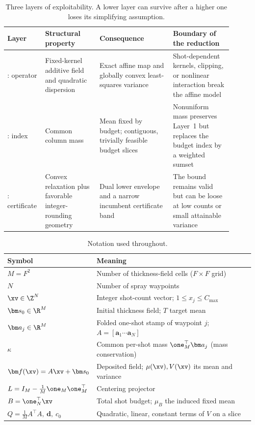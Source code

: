 \begin{table}[t]\centering\small\setlength{\tabcolsep}{4pt}
\caption{Three layers of exploitability.  A lower layer can survive after a
higher one loses its simplifying assumption.}
\label{tab:layers}
\begin{tabular}{>{\raggedright\arraybackslash}p{0.12\linewidth}
                >{\raggedright\arraybackslash}p{0.23\linewidth}
                >{\raggedright\arraybackslash}p{0.31\linewidth}
                >{\raggedright\arraybackslash}p{0.25\linewidth}}
\toprule
Layer & Structural property & Consequence & Boundary of the reduction\\
\midrule
1: operator & Fixed-kernel additive field and quadratic dispersion
& Exact affine map and globally convex least-squares variance
& Shot-dependent kernels, clipping, or nonlinear interaction break the affine model\\
2: index & Common column mass
& Mean fixed by budget; contiguous, trivially feasible budget slices
& Nonuniform mass preserves Layer~1 but replaces the budget index by a weighted sumset\\
3: certificate & Convex relaxation plus favorable integer-rounding geometry
& Dual lower envelope and a narrow incumbent certificate band
& The bound remains valid but can be loose at low counts or small attainable variance\\
\bottomrule
\end{tabular}
\end{table}

\begin{table}[t]\centering\small\setlength{\tabcolsep}{5pt}
\caption{Notation used throughout.}
\label{tab:notation}
\begin{tabular}{ll}
\toprule
Symbol & Meaning\\
\midrule
$M=F^2$ & Number of thickness-field cells ($F\times F$ grid)\\
$N$ & Number of spray waypoints\\
$\xv\in\Z^N$ & Integer shot-count vector; $1\le x_j\le C_{\max}$\\
$\bm s_0\in\R^M$ & Initial thickness field; $T$ target mean\\
$\bm a_j\in\R^M$ & Folded one-shot stamp of waypoint $j$; $A=[\bm a_1\cdots\bm a_N]$\\
$\kappa$ & Common per-shot mass $\one_M^\top\bm a_j$ (mass conservation)\\
$\bm f(\xv)=A\xv+\bm s_0$ & Deposited field; $\mu(\xv),V(\xv)$ its mean and variance\\
$L=I_M-\tfrac1M\one_M\one_M^\top$ & Centering projector\\
$B=\one_N^\top\xv$ & Total shot budget; $\mu_B$ the induced fixed mean\\
$Q=\tfrac1M A^\top A,\ \bm d,\ c_0$ & Quadratic, linear, constant terms of $V$ on a slice\\
\bottomrule
\end{tabular}
\end{table}

